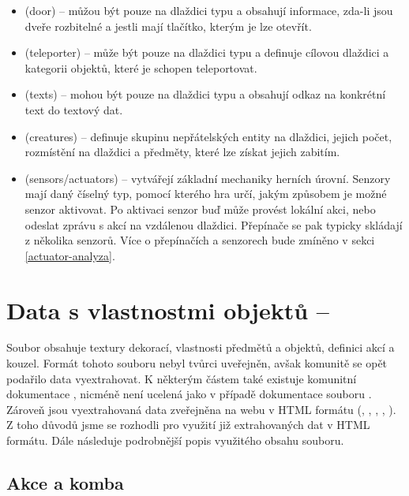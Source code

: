 \begin{itemize}
\item {} (door) -- můžou být pouze na dlaždici typu  a obsahují informace, zda-li jsou dveře rozbitelné a jestli 
	mají tlačítko, kterým je lze otevřít.
\item {} (teleporter) -- může být pouze na dlaždici typu  a definuje cílovou dlaždici a kategorii objektů, které je schopen teleportovat.
\item {} (texts) -- mohou být pouze na dlaždici typu  a obsahují odkaz na konkrétní text do textový dat.
\item {} (creatures) -- definuje skupinu nepřátelských entity na dlaždici, jejich počet, rozmístění na dlaždici a předměty, které lze získat jejich zabitím.
\item {} (sensors/actuators) -- vytvářejí základní mechaniky herních úrovní. Senzory mají daný číselný typ, pomocí kterého hra 
	určí, jakým způsobem je možné senzor
	aktivovat. Po aktivaci senzor buď může provést lokální akci, nebo odeslat zprávu s akcí na vzdálenou 
	dlaždici. Přepínače se pak typicky skládají z několika senzorů. Více o přepínačích a senzorech bude zmíněno
	v sekci \ref{actuator-analyza}. 
\end{itemize}

\section{Data s vlastnostmi objektů -- }\label{dungeon-properties}

Soubor  obsahuje textury dekorací, vlastnosti předmětů a objektů, definici akcí a kouzel.
Formát tohoto souboru nebyl tvůrci uveřejněn, avšak komunitě se opět podařilo data
vyextrahovat. K některým částem také existuje komunitní dokumentace \cite{DMGraphicsDAT}, 
nicméně není ucelená jako v případě dokumentace souboru . Zároveň 
jsou vyextrahovaná data zveřejněna na webu v HTML formátu (\cite{DMActions}, \cite{DMItems}, \cite{DMItemDescriptors}, \cite{DMSpells}, \cite{DMCreatures}). Z toho důvodů jsme se rozhodli 
pro využití již extrahovaných dat v HTML formátu. Dále následuje podrobnější popis využitého obsahu souboru.

\subsection{Akce a komba}\label{action-combos}

